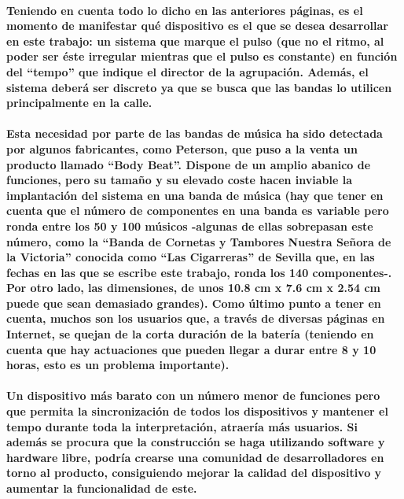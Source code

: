 \paragraph{
Teniendo en cuenta todo lo dicho en las anteriores páginas, es el momento de manifestar qué dispositivo es el que se desea desarrollar en este trabajo: un sistema que marque el pulso (que no el ritmo, al poder ser éste irregular mientras que el pulso es constante) en función del “tempo” que indique el director de la agrupación. Además, el sistema deberá ser discreto ya que se busca que las bandas lo utilicen principalmente en la calle.
}

\paragraph{
Esta necesidad por parte de las bandas de música ha sido detectada por algunos fabricantes, como Peterson, que puso a la venta un producto llamado “Body Beat”. Dispone de un amplio abanico de funciones, pero su tamaño y su elevado coste hacen inviable la implantación del sistema en una banda de música (hay que tener en cuenta que el número de componentes en una banda es variable pero ronda entre los 50 y 100 músicos -algunas de ellas sobrepasan este número, como la “Banda de Cornetas y Tambores Nuestra Señora de la Victoria” conocida como “Las Cigarreras” de Sevilla \cite{cigarreras} que, en las fechas en las que se escribe este trabajo, ronda los 140 componentes-. Por otro lado, las dimensiones, de unos 10.8 cm x 7.6 cm x 2.54 cm puede que sean demasiado grandes). Como último punto a tener en cuenta, muchos son los usuarios que, a través de diversas páginas en Internet, se quejan de la corta duración de la batería (teniendo en cuenta que hay actuaciones que pueden llegar a durar entre 8 y 10 horas, esto es un problema importante).
}

\paragraph{
Un dispositivo más barato con un número menor de funciones pero que permita la sincronización de todos los dispositivos y mantener el tempo durante toda la interpretación, atraería más usuarios. Si además se procura que la construcción se haga utilizando software y hardware libre, podría crearse una comunidad de desarrolladores en torno al producto, consiguiendo mejorar la calidad del dispositivo y aumentar la funcionalidad de este.
}

